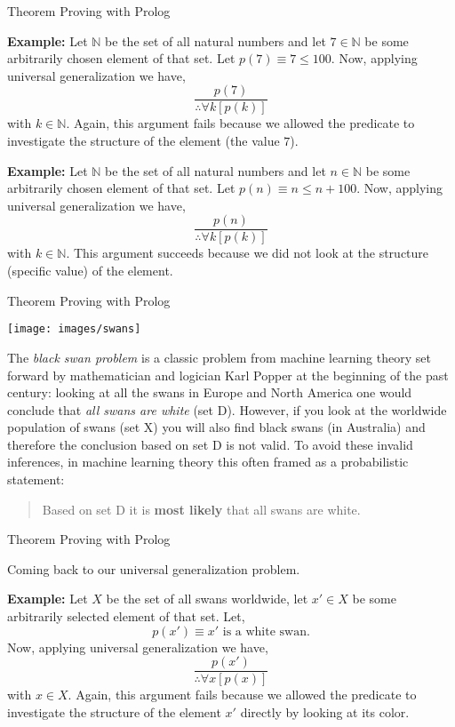 \documentclass{beamer}
\begin{document}
\begin{frame}[fragile]{Theorem Proving with Prolog}

\scriptsize

{\bf Example:} Let $\mathbb{N}$ be the set of all natural numbers and let $7\in\mathbb{N}$ be some arbitrarily chosen
element of that set.  Let $p(7)\equiv 7 \le 100$.  Now, applying universal generalization we have, 
\[
\frac{p(7)}{\therefore \forall k[p(k)]}
\]
with $k\in\mathbb{N}$.  Again, this argument fails because we allowed the predicate to investigate the structure of
the element (the value $7$).

\vspace{.3in}
{\bf Example:} Let $\mathbb{N}$ be the set of all natural numbers and let $n\in\mathbb{N}$ be some arbitrarily chosen
element of that set.  Let $p(n)\equiv n \le n+100$.  Now, applying universal generalization we have, 
\[
\frac{p(n)}{\therefore \forall k[p(k)]}
\]
with $k\in\mathbb{N}$.  This argument succeeds because we did not look at the structure (specific value) of the element.

\end{frame}



\begin{frame}[fragile]{Theorem Proving with Prolog}

\scriptsize
\begin{center}
    \texttt{[image: images/swans]}
\end{center}

\vspace{.1in}
The {\em black swan problem} is a classic problem from machine learning theory set forward by mathematician and logician Karl Popper at the beginning of the past century: looking at all the swans in Europe and
North America one would conclude that {\em all swans are white} (set D).  However, if you look at the worldwide population of swans (set X) you will also find black swans (in Australia) and therefore the conclusion based on set D is not valid.
To avoid these invalid inferences, in machine learning theory this often framed as a probabilistic statement:
\begin{quote}
Based on set D it is {\bf most likely} that all swans are white.
\end{quote}

\end{frame}


\begin{frame}[fragile]{Theorem Proving with Prolog}

\scriptsize
Coming back to our universal generalization problem.

\vspace{.1in}
{\bf Example:} Let $X$ be the set of all swans worldwide, let $x'\in X$ be some arbitrarily selected element
of that set.  Let,
\[
p(x') \equiv x' \mbox{ is a white swan.}
\] 
 Now, applying universal generalization we have, 
\[
\frac{p(x')}{\therefore \forall x[p(x)]}
\]
with $x\in X$.  Again, this argument fails because we allowed the predicate to investigate the structure of
the element  $x'$ directly by looking at its color.
\end{frame}
\end{document}
